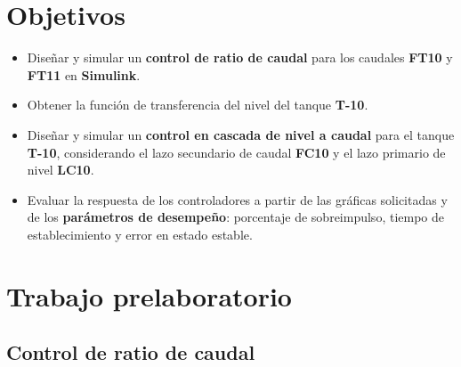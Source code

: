 \section{Objetivos}

\begin{itemize}
    \item Diseñar y simular un \textbf{control de ratio de caudal} para los caudales \textbf{FT10} y \textbf{FT11} en \textbf{Simulink}.

    \item Obtener la función de transferencia del nivel del tanque \textbf{T-10}.

    \item Diseñar y simular un \textbf{control en cascada de nivel a caudal} para el tanque \textbf{T-10}, considerando el lazo secundario de caudal \textbf{FC10} y el lazo primario de nivel \textbf{LC10}.

    \item Evaluar la respuesta de los controladores a partir de las gráficas solicitadas y de los \textbf{parámetros de desempeño}: porcentaje de sobreimpulso, tiempo de establecimiento y error en estado estable.
\end{itemize}

\section{Trabajo prelaboratorio}



\subsection{Control de ratio de caudal}

